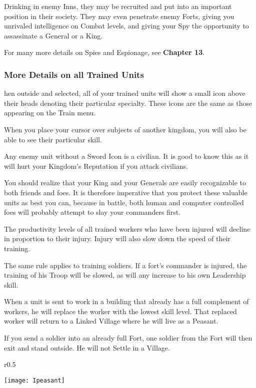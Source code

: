 
Drinking in enemy Inns, they may be recruited and put into an important position in their society. They may even penetrate enemy Forts, giving you unrivaled intelligence on Combat levels, and giving your Spy the opportunity to assassinate a General or a King. 

For many more details on Spies and Espionage, see \textbf{Chapter 13}.

\subsubsection{\textsf{More Details on all Trained Units}}

hen outside and selected, all of your trained units will show a small icon above their heads denoting their particular specialty. These icons are the same as those appearing on the Train menu.

When you place your cursor over subjects of another kingdom, you will also be able to see their particular skill.

Any enemy unit without a Sword Icon is a civilian. It is good to know this as it will hurt your Kingdom’s Reputation if you attack civilians.

You should realize that your King and your Generals are easily recognizable to both friends and foes. It is therefore imperative that you protect these valuable units as best you can, because in battle, both human and computer controlled foes will probably attempt to slay your commanders first.

The productivity levels of all trained workers who have been injured will decline in proportion to their injury. Injury will also slow down the speed of their training.

The same rule applies to training soldiers. If a fort’s commander is injured, the training of his Troop will be slowed, as will any increase to his own Leadership skill.

When a unit is sent to work in a building that already has a full complement of workers, he will replace the worker with the lowest skill level. That replaced worker will return to a Linked Village where he will live as a Peasant.

If you send a soldier into an already full Fort, one soldier from the Fort will then exit and stand outside. He will not Settle in a Village.

\begin{wrapfigure}{r}{0.5\textwidth}
    \vspace{-20pt}
    \begin{center}
        \texttt{[image: Ipeasant]} %
    \end{center}
    \vspace{-20pt}
\end{wrapfigure}

